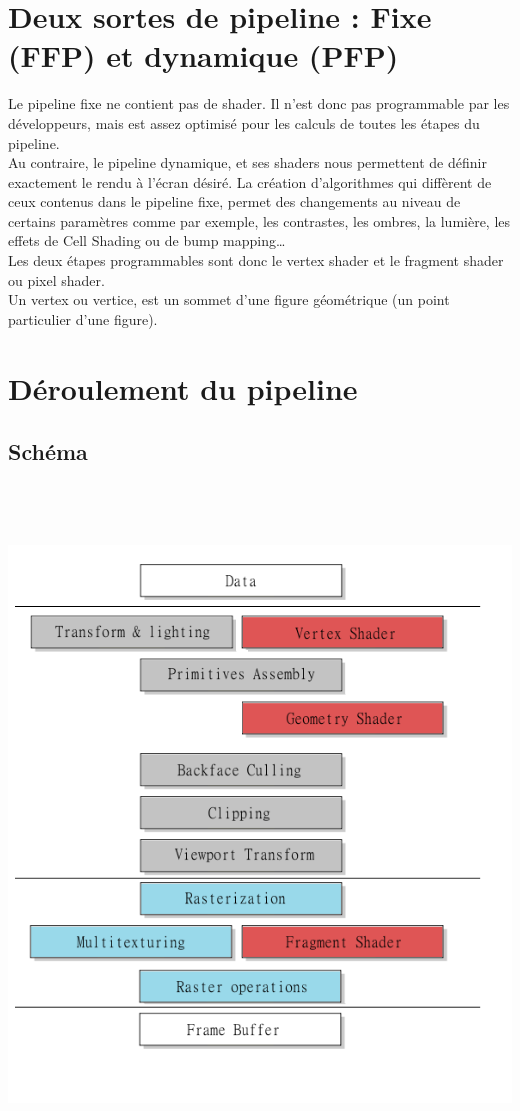 \section{Deux sortes de pipeline : Fixe (FFP) et dynamique (PFP)}
Le pipeline fixe ne contient pas de shader. Il n’est donc pas programmable par les développeurs, mais est assez optimisé pour les calculs de toutes les étapes du pipeline.
\\
Au contraire, le pipeline dynamique, et ses shaders nous permettent de définir exactement le rendu à l’écran désiré. La création d’algorithmes qui diffèrent de ceux contenus dans le pipeline fixe, permet des changements au niveau de certains paramètres comme par exemple, les contrastes, les ombres, la lumière, les effets de Cell Shading ou de bump mapping…
\\
Les deux étapes programmables sont donc le vertex shader et le fragment shader ou pixel shader.
\\
Un vertex ou vertice, est un sommet d’une figure géométrique (un point particulier d’une figure).

\section{Déroulement du pipeline}
\subsection{Schéma}
\includegraphics[width=14cm,height=180mm]{leo/images/pipeline.png}
